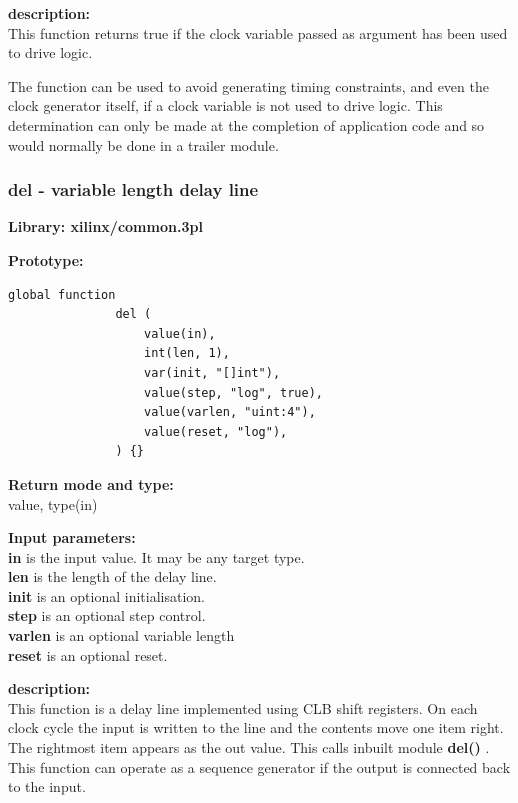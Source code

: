             {\bf description:} \\
            This function returns true if the clock variable passed as argument
            has been used to drive logic.
            
            The function can be used to avoid generating timing constraints, and
            even the clock generator itself, if a clock variable is not used
            to drive logic. This determination can only be made at the completion
            of application code and so would normally be done in a trailer
            module.




        \subsubsection{del - variable length delay line}\label{sec:lfdel}
            
            {\bf Library: xilinx/common.3pl}

            {\bf Prototype:} \\
            \vsp
            \begin{lstlisting}[gobble=12, language=threepl]
               global function
               del (
                   value(in),
                   int(len, 1),
                   var(init, "[]int"),
                   value(step, "log", true),
                   value(varlen, "uint:4"),
                   value(reset, "log"),
               ) {}
            \end{lstlisting}

            {\bf Return mode and type:} \\
            value, type(in)

            {\bf Input parameters:} \\            
            {\bf in} is the input value. It may be any target type.\\
            {\bf len} is the length of the delay line.\\
            {\bf init} is an optional initialisation.\\
            {\bf step} is an optional step control.\\
            {\bf varlen} is an optional variable length\\
            {\bf reset} is an optional reset.

            {\bf description:} \\
            This function is a delay line implemented using CLB shift registers.
            On each clock cycle the input is written to the line and the
            contents move one item right. The rightmost item appears as the out
            value. This calls inbuilt module {\bf del()} .
            This function can operate as a sequence generator if the output is
            connected back to the input.

